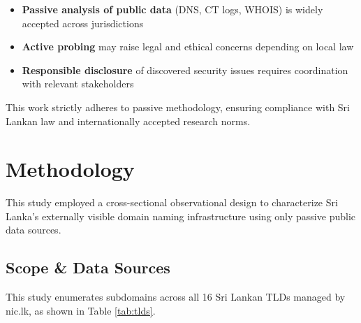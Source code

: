 \documentclass[preprint,review,12pt]{elsarticle}
\begin{document}
\begin{itemize}
    \item \textbf{Passive analysis of public data} (DNS, CT logs, WHOIS) is widely accepted across jurisdictions
    \item \textbf{Active probing} may raise legal and ethical concerns depending on local law
    \item \textbf{Responsible disclosure} of discovered security issues requires coordination with relevant stakeholders
\end{itemize}

This work strictly adheres to passive methodology, ensuring compliance with Sri Lankan law and internationally accepted research norms.

\section{Methodology}
\label{sec:methodology}

This study employed a cross-sectional observational design to characterize Sri Lanka's externally visible domain naming infrastructure using only passive public data sources.

\subsection{Scope \& Data Sources}

This study enumerates subdomains across all 16 Sri Lankan TLDs managed by nic.lk, as shown in Table \ref{tab:tlds}.
\end{document}
